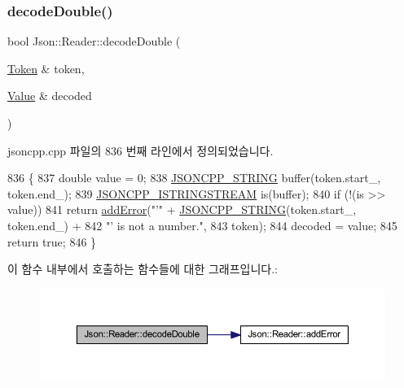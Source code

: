 \subsubsection{\texorpdfstring{decode\+Double()}{decodeDouble()}\hspace{0.1cm}{\footnotesize\ttfamily [2/2]}}
{\footnotesize\ttfamily bool Json\+::\+Reader\+::decode\+Double (\begin{DoxyParamCaption}\item[{\hyperlink{class_json_1_1_reader_1_1_token}{Token} \&}]{token,  }\item[{\hyperlink{class_json_1_1_value}{Value} \&}]{decoded }\end{DoxyParamCaption})\hspace{0.3cm}{\ttfamily [private]}}



jsoncpp.\+cpp 파일의 836 번째 라인에서 정의되었습니다.


\begin{DoxyCode}
836                                                       \{
837   \textcolor{keywordtype}{double} value = 0;
838   \hyperlink{json-forwards_8h_a1e723f95759de062585bc4a8fd3fa4be}{JSONCPP\_STRING} buffer(token.start\_, token.end\_);
839   \hyperlink{json-forwards_8h_a1b5d70fe3d83273d200193177ded4c25}{JSONCPP\_ISTRINGSTREAM} is(buffer);
840   \textcolor{keywordflow}{if} (!(is >> value))
841     \textcolor{keywordflow}{return} \hyperlink{class_json_1_1_reader_af02176a1d2786b4415bbb00a1b10bb6b}{addError}(\textcolor{stringliteral}{"'"} + \hyperlink{json-forwards_8h_a1e723f95759de062585bc4a8fd3fa4be}{JSONCPP\_STRING}(token.start\_, token.end\_) +
842                         \textcolor{stringliteral}{"' is not a number."},
843                     token);
844   decoded = value;
845   \textcolor{keywordflow}{return} \textcolor{keyword}{true};
846 \}
\end{DoxyCode}
이 함수 내부에서 호출하는 함수들에 대한 그래프입니다.\+:\nopagebreak
\begin{figure}[H]
\begin{center}
\leavevmode
\includegraphics[width=350pt]{class_json_1_1_reader_a5e4a66be7c413bca86078f14df5eb802_cgraph}
\end{center}
\end{figure}
\mbox{\label{class_json_1_1_reader_a442d1f23edf0f4350f5eeab3ee3f7d46}} 
